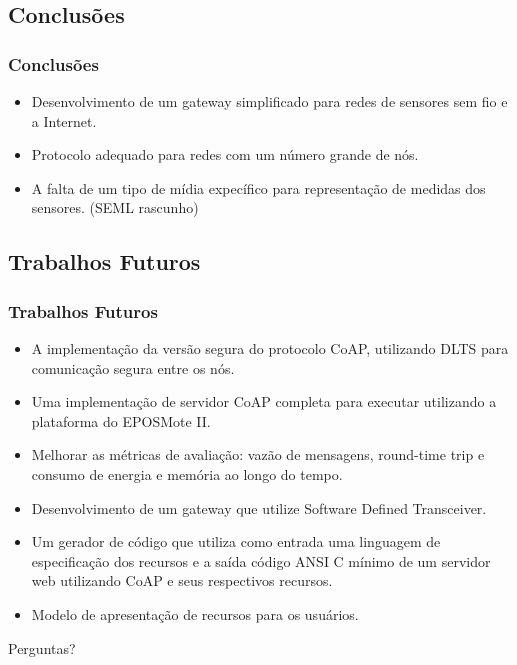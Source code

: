 \documentclass{beamer}
\begin{document}
\subsection{Conclusões}
\begin{frame}
\frametitle{Conclusões}
\begin{itemize}
    \item Desenvolvimento de um gateway simplificado para redes de sensores sem fio e a Internet. 
    \item Protocolo adequado para redes com um número grande de nós.
    \item A falta de um tipo de mídia expecífico para representação de medidas dos sensores. (SEML rascunho)
\end{itemize}
\end{frame}
\subsection{Trabalhos Futuros}
\begin{frame}
\frametitle{Trabalhos Futuros}

\begin{itemize}
    \item A implementa\c{c}\~ao da vers\~ao segura do protocolo CoAP, utilizando DLTS para comunica\c{c}\~ao segura entre os n\'os.
    \item Uma implementa\c{c}\~ao de servidor CoAP completa para executar utilizando a plataforma do EPOSMote II.
    \item Melhorar as métricas de avaliação: vazão de mensagens, round-time trip e consumo de energia e memória ao longo do tempo.

    \item Desenvolvimento de um gateway que utilize Software Defined Transceiver.

    \item Um gerador de c\'odigo que utiliza como entrada uma linguagem de especifica\c{c}\~ao dos recursos e a sa\'ida c\'odigo ANSI C m\'inimo de um servidor web utilizando CoAP e seus respectivos recursos.

    \item Modelo de apresentação de recursos para os usuários.
\end{itemize}
\end{frame}

\begin{frame}
\Huge{\centerline{Perguntas?}}
\end{frame}

\end{document}
